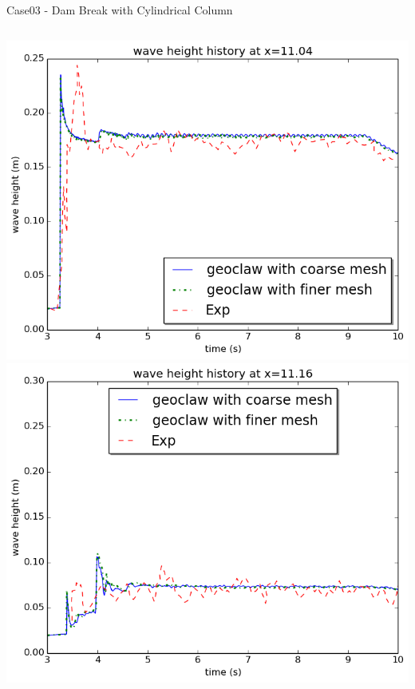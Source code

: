 \documentclass[xcolor=dvipsnames]{beamer}
\begin{document}
\begin{frame}[label=sec-5-7]{Case03 - Dam Break with Cylindrical Column}
\begin{columns}
\begin{column}{0.5\textwidth}
\begin{block}{}
\includegraphics[width=.9\linewidth]{../paper/plots/waveheight_cylinder_x1104_largerTimeScale_finer.png}  \\
     \includegraphics[width=.9\linewidth]{../paper/plots/waveheight_cylinder_x1116_finer.png} \\
\end{block}
\end{column}
\end{columns}

\begin{block}{}
\vskip5mm
\end{block}
\end{frame}
\end{document}
